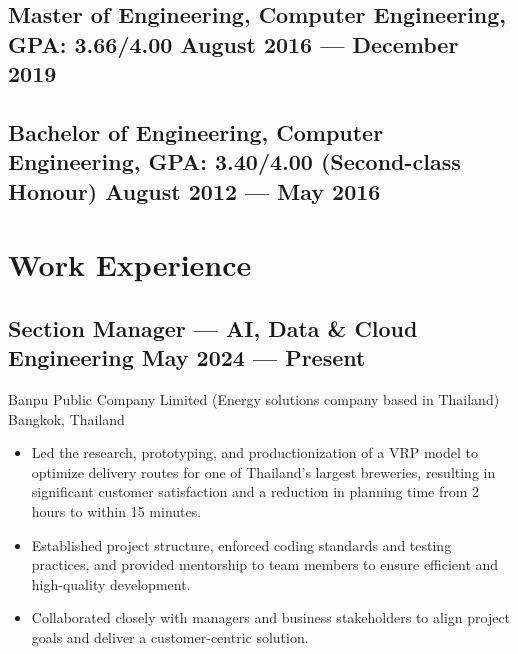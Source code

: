 \documentclass{article}
\newcommand{\subtext}[1]{
#1\par\vspace{-0.2cm}}
\newenvironment{zitemize}{
\begin{itemize}\itemsep0pt \parskip0pt \parsep1pt}
{\end{itemize}\vspace{-0.5cm}}
\begin{document}
        \subsection*{Master of Engineering, Computer Engineering, {\normalsize \normalfont GPA: 3.66/4.00} \hfill August 2016 --- December 2019}
        \vspace{0.1cm}
        \subsection*{Bachelor of Engineering, Computer Engineering, {\normalsize \normalfont GPA: 3.40/4.00 \small{(Second-class Honour)}} \hfill August 2012 --- May 2016}
        \vspace{0.1cm}

    \section{Work Experience}
    \vspace{-0.1cm}

        \subsection*{Section Manager --- AI, Data \& Cloud Engineering \hfill May 2024 --- Present}
        \subtext{Banpu Public Company Limited {\scriptsize (Energy solutions company based in Thailand)} \hfill Bangkok, Thailand}
            \vspace{0.05cm}
            \begin{zitemize}
                \item Led the research, prototyping, and productionization of a VRP model to optimize delivery routes for one of Thailand's largest breweries, resulting in significant customer satisfaction and a reduction in planning time from 2 hours to within 15 minutes.
                \item Established project structure, enforced coding standards and testing practices, and provided mentorship to team members to ensure efficient and high-quality development.
                \item Collaborated closely with managers and business stakeholders to align project goals and deliver a customer-centric solution.
            \end{zitemize}
\end{document}
